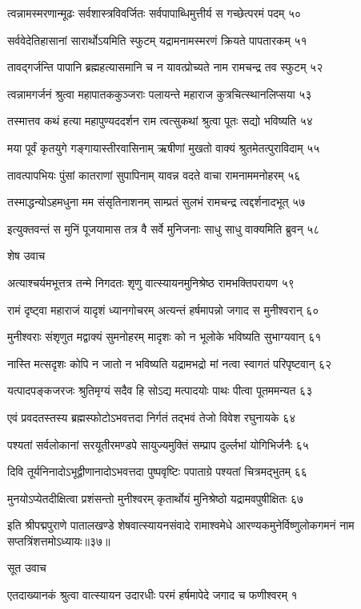 त्वन्नामस्मरणान्मूढः सर्वशास्त्रविवर्जितः
सर्वपापाब्धिमुत्तीर्य स गच्छेत्परमं पदम् ५०

सर्ववेदेतिहासानां सारार्थोऽयमिति स्फुटम्
यद्रामनामस्मरणं क्रियते पापतारकम् ५१

तावद्गर्जन्ति पापानि ब्रह्महत्यासमानि च
न यावत्प्रोच्यते नाम रामचन्द्र तव स्फुटम् ५२

त्वन्नामगर्जनं श्रुत्वा महापातककुञ्जराः
पलायन्ते महाराज कुत्रचित्स्थानलिप्सया ५३

तस्मात्तव कथं हत्या महापुण्यददर्शन
राम त्वत्सुकथां श्रुत्वा पूतः सद्यो भविष्यति ५४

मया पूर्वं कृतयुगे गङ्गायास्तीरवासिनाम्
ऋषीणां मुखतो वाक्यं श्रुतमेतत्पुराविदाम् ५५

तावत्पापभियः पुंसां कातराणां सुपापिनाम्
यावन्न वदते वाचा रामनाममनोहरम् ५६

तस्माद्धन्योऽहमधुना मम संसृतिनाशनम्
साम्प्रतं सुलभं रामचन्द्र त्वद्दर्शनादभूत् ५७

इत्युक्तवन्तं स मुनिं पूजयामास तत्र वै
सर्वे मुनिजनाः साधु साधु वाक्यमिति ब्रुवन् ५८

शेष उवाच

अत्याश्चर्यमभूत्तत्र तन्मे निगदतः शृणु
वात्स्यायनमुनिश्रेष्ठ रामभक्तिपरायण ५९

रामं दृष्ट्वा महाराजं यादृशं ध्यानगोचरम्
अत्यन्तं हर्षमापन्नो जगाद स मुनीश्वरान् ६०

मुनीश्वराः संशृणुत मद्वाक्यं सुमनोहरम्
मादृशः को न भूलोके भविष्यति सुभाग्यवान् ६१

नास्ति मत्सदृशः कोपि न जातो न भविष्यति
यद्रामभद्रो मां नत्वा स्वागतं परिपृष्टवान् ६२

यत्पादपङ्कजरजः श्रुतिमृग्यं सदैव हि
सोऽद्य मत्पादयोः पाथः पीत्वा पूतममन्यत ६३

एवं प्रवदतस्तस्य ब्रह्मस्फोटोऽभवत्तदा
निर्गतं तद्भवं तेजो विवेश रघुनायके ६४

पश्यतां सर्वलोकानां सरयूतीरमण्डपे
सायुज्यमुक्तिं सम्प्राप दुर्ल्लभां योगिभिर्जनैः ६५

दिवि तूर्यनिनादोऽभूद्वीणानादोऽभवत्तदा
पुष्पवृष्टिः पपाताग्रे पश्यतां चित्रमद्भुतम् ६६

मुनयोऽप्येतदीक्षित्वा प्रशंसन्तो मुनीश्वरम्
कृतार्थोयं मुनिश्रेष्ठो यद्रामवपुषीक्षितः ६७

इति श्रीपद्मपुराणे पातालखण्डे शेषवात्स्यायनसंवादे रामाश्वमेधे आरण्यकमुनेर्विष्णुलोकगमनं नाम सप्तत्रिंशत्तमोऽध्यायः॥३७॥


सूत उवाच

एतदाख्यानकं श्रुत्वा वात्स्यायन उदारधीः
परमं हर्षमापेदे जगाद च फणीश्वरम् १

